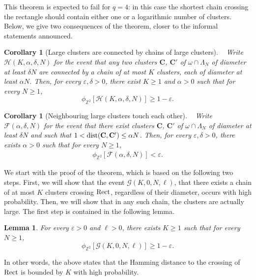 \documentclass[a4paper,oneside,11pt]{article}
\newtheorem{corollary}[theorem]{Corollary}
\newtheorem{lemma}[theorem]{Lemma}
\numberwithin{equation}{section}
\numberwithin{equation}{section}
\numberwithin{equation}{section}
\newcommand{\calF}{\mathcal{F}}
\newcommand{\calG}{\mathcal{G}}
\newcommand{\calH}{\mathcal{H}}
\newcommand{\bbZ}{\mathbb{Z}}
\newcommand{\bfC}{\mathbf C}
\newcommand{\ep}{\varepsilon}
\newcommand{\eps}{\varepsilon}
\newcommand{\La}{\Lambda}
\renewcommand{\ep}{\varepsilon}
\begin{document}
This theorem is expected to fail for $q=4$: 
in this case the shortest chain crossing the rectangle should contain either one or a logarithmic number of clusters.
Below, we give two consequences of the theorem, closer to the informal statements announced. 

\begin{corollary}[Large clusters are connected by chains of large clusters]\label{cor:chain}~
	Write $\calH(K, \alpha, \delta ,N)$ for the event that any two clusters $\bfC$, $\bfC'$ of $\omega\cap \La_N$
	of  diameter at least $\delta N$ are connected by a chain of at most $K$ clusters, each of diameter at least $\alpha N$.
Then, for every $\ep,\delta > 0$, there exist $K \geq 1$ and $\alpha >0$ such that for every $N\ge1$,
	$$ \phi_{\bbZ^2}[\calH(K,\alpha,\delta,N)] \geq 1 - \eps.$$ 
\end{corollary}


\begin{corollary}[Neighbouring large clusters touch each other]\label{cor:clusters_touch}~
	Write $\calF(\alpha, \delta ,N)$
	for the event that  there exist clusters $\bfC$, $\bfC'$ of $\omega \cap \La_N$ 
	of diameter at least $\delta N$ and such that $1< {\rm dist}(\bfC,\bfC') \leq \alpha N$.
	Then, for every $\ep,\delta > 0$, there exists $\alpha >0$ such that for every $N\ge1$,
	\begin{align}\label{eq:clusters_touch}
		\phi_{\bbZ^2}[\calF(\alpha,\delta,N)] < \eps.
	\end{align}
\end{corollary}


We start with the proof of the theorem, which is based on the following two steps. 
First, we will show that the event $\calG(K,0,N,\ell)$, that there exists a chain of at most $K$ clusters crossing ${\rm Rect}$, 
regardless of their diameter, occurs with high probability. 
Then, we will show that in any such chain, the clusters are actually large. 
The first step is contained in the following lemma. 

\begin{lemma}\label{lem:bounded hamming}
	For every $\ep>0$ and $\ell > 0$, there exists $ K \geq1$ such that for every $N \ge 1$,
	$$ \phi_{\bbZ^2}[\calG(K,0,N,\ell)] \geq 1 - \eps.$$ 
\end{lemma}

In other words, the above states that the Hamming distance to the crossing of ${\rm Rect}$ is bounded by $K$ with high probability. 
\end{document}
